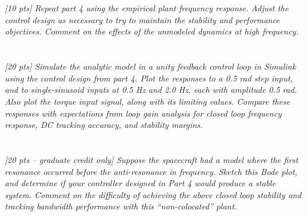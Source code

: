 \documentclass{article}
\begin{document}
\section{}

\textit{[10 pts] Repeat part 4 using the empirical plant frequency response. Adjust the control design as necessary to try to maintain the stability and performance objectives. Comment on the effects of the unmodeled dynamics at high frequency.}

\section{}

\textit{[20 pts] Simulate the analytic model in a unity feedback control loop in Simulink using the control design from part 4. Plot the responses to a 0.5 rad step input, and to single-sinusoid inputs at 0.5 Hz and 2.0 Hz, each with amplitude 0.5 rad. Also plot the torque input signal, along with its limiting values. Compare these responses with expectations from loop gain analysis for closed loop frequency response, DC tracking accuracy, and stability margins.}

\section{}

\textit{[20 pts – graduate credit only] Suppose the spacecraft had a model where the first resonance occurred before the anti-resonance in frequency. Sketch this Bode plot, and determine if your controller designed in Part 4 would produce a stable system. Comment on the difficulty of achieving the above closed loop stability and tracking bandwidth performance with this “non-colocated” plant.}
\end{document}
